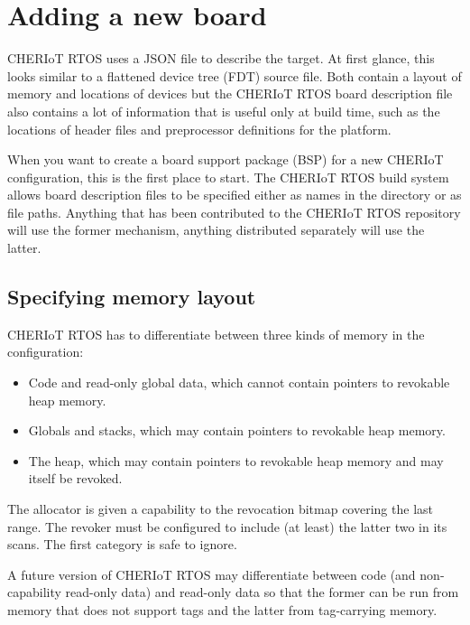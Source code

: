 \chapter[label=new_board]{Adding a new board}

CHERIoT RTOS uses a JSON file to describe the target.
At first glance, this looks similar to a flattened device tree (FDT) source file.
Both contain a layout of memory and locations of devices but the CHERIoT RTOS board description file also contains a lot of information that is useful only at build time, such as the locations of header files and preprocessor definitions for the platform.

When you want to create a board support package (BSP) for a new CHERIoT configuration, this is the first place to start.
The CHERIoT RTOS build system allows board description files to be specified either as names in the  directory or as file paths.
Anything that has been contributed to the CHERIoT RTOS repository will use the former mechanism, anything distributed separately will use the latter.

\section{Specifying memory layout}

CHERIoT RTOS has to differentiate between three kinds of memory in the configuration:

\begin{itemize}
	\item{Code and read-only global data, which cannot contain pointers to revokable heap memory.}
	\item{Globals and stacks, which may contain pointers to revokable heap memory.}
	\item{The heap, which may contain pointers to revokable heap memory and may itself be revoked.}
\end{itemize}

The allocator is given a capability to the revocation bitmap covering the last range.
The revoker must be configured to include (at least) the latter two in its scans.
The first category is safe to ignore.

\begin{note}
A future version of CHERIoT RTOS may differentiate between code (and non-capability read-only data) and read-only data so that the former can be run from memory that does not support tags and the latter from tag-carrying memory.
\end{note}

